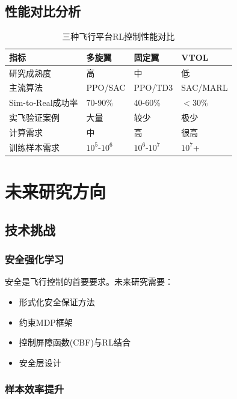 \documentclass[12pt,a4paper]{ctexart}
\begin{document}
\subsection{性能对比分析}

\begin{table}[htbp]
\centering
\caption{三种飞行平台RL控制性能对比}\label{tab:performance}
\begin{tabular}{@{}llll@{}}
\toprule
\textbf{指标} & \textbf{多旋翼} & \textbf{固定翼} & \textbf{VTOL} \\
\midrule
研究成熟度 & 高 & 中 & 低 \\
主流算法 & PPO/SAC & PPO/TD3 & SAC/MARL \\
Sim-to-Real成功率 & 70-90\% & 40-60\% & $<$30\% \\
实飞验证案例 & 大量 & 较少 & 极少 \\
计算需求 & 中 & 高 & 很高 \\
训练样本需求 & $10^5$-$10^6$ & $10^6$-$10^7$ & $10^7$+ \\
\bottomrule
\end{tabular}
\end{table}

\section{未来研究方向}\label{sec:future}

\subsection{技术挑战}

\subsubsection{安全强化学习}

安全是飞行控制的首要要求。未来研究需要：
\begin{itemize}
    \item 形式化安全保证方法
    \item 约束MDP框架
    \item 控制屏障函数(CBF)与RL结合
    \item 安全层设计
\end{itemize}

\subsubsection{样本效率提升}
\end{document}
